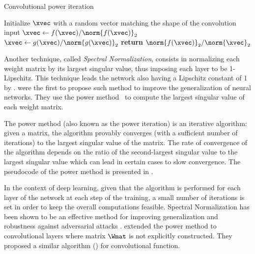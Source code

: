 \begin{algorithm}[ht]
  \caption{Convolutional power iteration \cite{farnia2018generalizable}}
  \begin{algorithmic}[1]
    \State Initialize $\xvec$ with a random vector matching the shape of the convolution input
      \State $\xvec \gets f(\xvec) / \norm{f(\xvec)}_2 $
      \State $\xvec \gets g(\xvec) / \norm{g(\xvec)}_2$
    \EndFor
    \State \textbf{return} $\norm{f(\xvec)}_2 / \norm{\xvec}_2$
  \end{algorithmic}
  \label{algorithm:ch3-power_method_generic}
\end{algorithm}


Another technique, called \emph{Spectral Normalization}, consists in normalizing each weight matrix by its largest singular value, thus imposing each layer to be 1-Lipschitz.
This technique leads the network also having a Lipschitz constant of 1 by .
\citet{yoshida2017spectral} were the first to propose such method to improve the generalization of neural networks.
They use the power method~\cite{golub2000eigenvalue} to compute the largest singular value of each weight matrix.

The power method (also known as the power iteration) is an iterative algorithm: given a matrix, the algorithm provably converges (with a sufficient number of iterations) to the largest singular value of the matrix.
The rate of convergence of the algorithm depends on the ratio of the second-largest singular value to the largest singular value which can lead in certain cases to slow convergence.
The pseudocode of the power method is presented in .

In the context of deep learning, given that the algorithm is performed for each layer of the network at each step of the training, a small number of iterations is set in order to keep the overall computations feasible.
Spectral Normalization has been shown to be an effective method for improving generalization and robustness against adversarial attacks \cite{miyato2018spectral,gouk2018regularisation,farnia2018generalizable}.
\citet{farnia2018generalizable} extended the power method to convolutional layers where matrix $\Wmat$ is not explicitly constructed.
They proposed a similar algorithm () for convolutional function.


